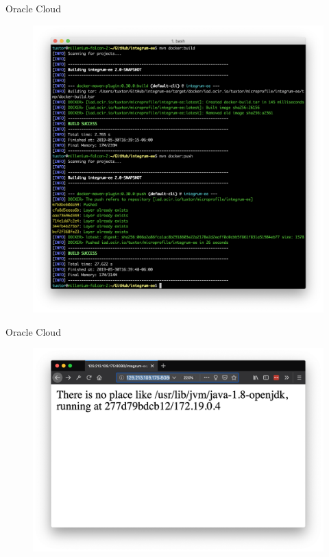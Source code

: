 \documentclass{beamer}
\begin{document}
\begin{frame}{Oracle Cloud}
\begin{figure}
	\centering
	\includegraphics[width=\linewidth]{Images/oc3}
\end{figure}
\end{frame}

\begin{frame}{Oracle Cloud}

\begin{figure}
	\centering
	\includegraphics[width=\linewidth]{Images/oc4}
\end{figure}
\end{frame}
\end{document}
